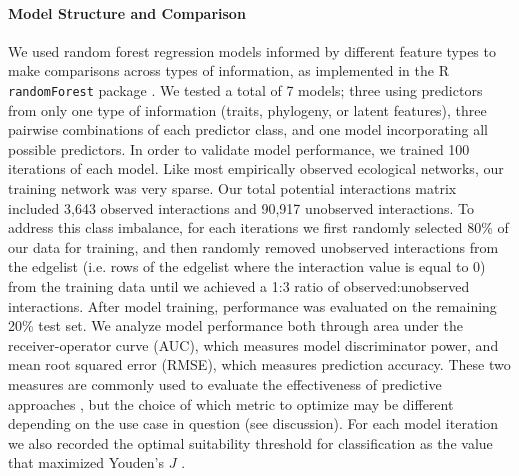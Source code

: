 \documentclass[num-refs]{wiley-article}%
\begin{document}
\paragraph{Model Structure and Comparison} We used random forest regression models informed by different feature types to make comparisons across types of information, as implemented in the R \texttt{randomForest} package \cite{randomForest}. We tested a total of 7 models; three using predictors from only one type of information (traits, phylogeny, or latent features), three pairwise combinations of each predictor class, and one model incorporating all possible predictors. In order to validate model performance, we trained 100 iterations of each model. Like most empirically observed ecological networks, our training network was very sparse\cite{vazquez2009uniting}. Our total potential interactions matrix included 3,643 observed interactions and 90,917 unobserved interactions. To address this class imbalance, for each iterations we first randomly selected 80\% of our data for training, and then randomly removed unobserved interactions from the edgelist (i.e. rows of the edgelist where the interaction value is equal to 0) from the training data until we achieved a 1:3 ratio of observed:unobserved interactions. After model training, performance was evaluated on the remaining 20\% test set. We analyze model performance both through area under the receiver-operator curve (AUC), which measures model discriminator power, and mean root squared error (RMSE), which measures prediction accuracy. These two measures are commonly used to evaluate the effectiveness of predictive approaches \cite{norberg2019comprehensive}, but the choice of which metric to optimize may be different depending on the use case in question (see discussion). For each model iteration we also recorded the optimal suitability threshold for classification as the value that maximized Youden's $J$ \cite{youden1950index}.
\end{document}
